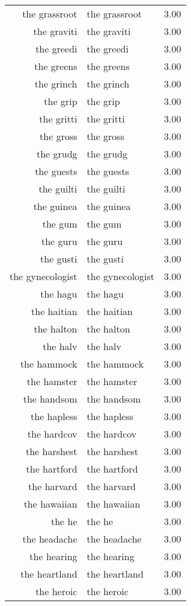 \begin{table}[ht]
\begin{tabular}{rlr}
  the grassroot & the grassroot & 3.00 \\ 
  the graviti & the graviti & 3.00 \\ 
  the greedi & the greedi & 3.00 \\ 
  the greens & the greens & 3.00 \\ 
  the grinch & the grinch & 3.00 \\ 
  the grip & the grip & 3.00 \\ 
  the gritti & the gritti & 3.00 \\ 
  the gross & the gross & 3.00 \\ 
  the grudg & the grudg & 3.00 \\ 
  the guests & the guests & 3.00 \\ 
  the guilti & the guilti & 3.00 \\ 
  the guinea & the guinea & 3.00 \\ 
  the gum & the gum & 3.00 \\ 
  the guru & the guru & 3.00 \\ 
  the gusti & the gusti & 3.00 \\ 
  the gynecologist & the gynecologist & 3.00 \\ 
  the hagu & the hagu & 3.00 \\ 
  the haitian & the haitian & 3.00 \\ 
  the halton & the halton & 3.00 \\ 
  the halv & the halv & 3.00 \\ 
  the hammock & the hammock & 3.00 \\ 
  the hamster & the hamster & 3.00 \\ 
  the handsom & the handsom & 3.00 \\ 
  the hapless & the hapless & 3.00 \\ 
  the hardcov & the hardcov & 3.00 \\ 
  the harshest & the harshest & 3.00 \\ 
  the hartford & the hartford & 3.00 \\ 
  the harvard & the harvard & 3.00 \\ 
  the hawaiian & the hawaiian & 3.00 \\ 
  the he & the he & 3.00 \\ 
  the headache & the headache & 3.00 \\ 
  the hearing & the hearing & 3.00 \\ 
  the heartland & the heartland & 3.00 \\ 
  the heroic & the heroic & 3.00 \\ 

\end{tabular}
\end{table}
